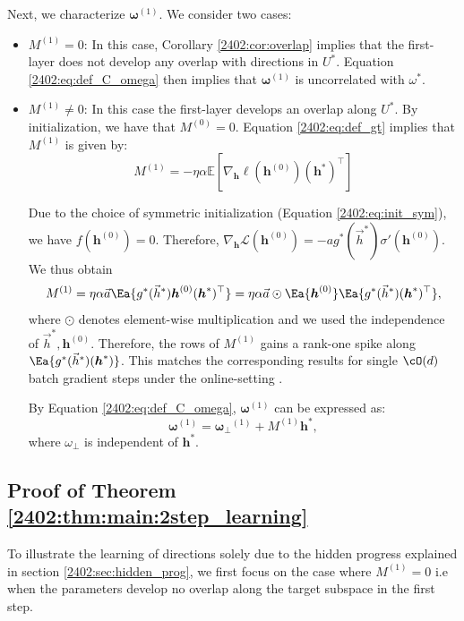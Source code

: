 Next, we characterize $\boldsymbol{\omega}^{(1)}$. We consider two cases:
\begin{itemize}
    \item $M^{(1)}=0$: In this case, Corollary \ref{2402:cor:overlap} implies that the first-layer does not develop any overlap with directions in $U^*$. Equation \eqref{2402:eq:def_C_omega} then implies that $\boldsymbol{\omega}^{(1)}$ is uncorrelated with $\omega^*$.
    \item  $M^{(1)}\neq 0$: In this case the first-layer develops an overlap along $U^*$. By initialization, we have that $M^{(0)}=0$.
    Equation \eqref{2402:eq:def_gt} implies that $M^{(1)}$ is given by:
    \begin{equation} \label{2402:eq:M_fist_step}
       M^{(1)}= - \eta \alpha \mathbb{E}\left[ \nabla_{\boldsymbol{h}} \ell(\boldsymbol{h}^{(0)}) \left( \boldsymbol{h}^* \right)^\top\right]
      \end{equation}

Due to the choice of symmetric initialization (Equation \ref{2402:eq:init_sym}), we have $f(\boldsymbol{h}^{(0)}) = 0$. Therefore, $
\nabla_{\boldsymbol{h}} \mathcal{L}(\boldsymbol{h}^{(0)}) = -ag^*(\vec{h}^*)\sigma'(\boldsymbol{h}^{(0)})$. We thus obtain
\begin{equation}
       M^{(1)}= \eta \alpha \vec{a}\Ea{g^*(\vec{h}^*) \boldsymbol{h}^{(0)}(\boldsymbol{h}^*)^\top} =  \eta \alpha \vec{a}\odot\Ea{\boldsymbol{h}^{(0)}}\Ea{g^*(\vec{h}^*) (\boldsymbol{h}^*)^\top},
\end{equation}
where $\odot$ denotes element-wise multiplication and we used the independence of $\vec{h}^*, \boldsymbol{h}^{(0)}$.
Therefore, the rows of $M^{(1)}$ gains a rank-one spike along $\Ea{g^*(\vec{h}^*)(\boldsymbol{h}^*)}$. This matches the corresponding results for single $\cO(d)$ batch gradient steps under the online-setting \citep{ba2022high,dandi2023how}.

By Equation \eqref{2402:eq:def_C_omega}, $\boldsymbol{\omega}^{(1)}$ can be expressed as:
\begin{equation}\label{2402:eq:overlap_staircase}
    \boldsymbol{\omega}^{(1)} = \boldsymbol{\omega_\perp}^{(1)}+ M^{(1)}\boldsymbol{h}^* ,
\end{equation}
where $\omega_\perp$ is independent of $\boldsymbol{h}^*$.
\end{itemize} 


\subsection{Proof of Theorem \ref{2402:thm:main:2step_learning}}\label{2402:app:sec:main_thm_proof}
To illustrate the learning of directions solely due to the hidden progress explained in section \ref{2402:sec:hidden_prog}, we first focus on the case where $M^{(1)}=0$ i.e when the parameters develop no overlap along the target subspace in the first step.

